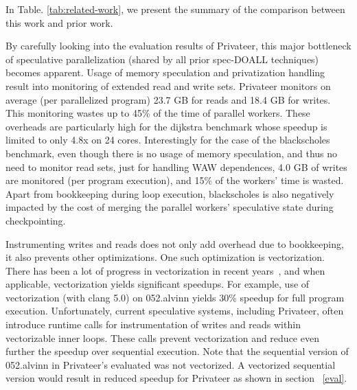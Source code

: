 In Table. \ref{tab:related-work}, we present the summary of the comparison
between this work and prior work.






By carefully looking into the evaluation results of Privateer, this major
bottleneck of speculative parallelization (shared by all prior spec-DOALL
techniques) becomes apparent.
%
Usage of memory speculation and privatization handling result into monitoring of
extended read and write sets.
%
Privateer monitors on average (per parallelized program) 23.7 GB for reads and
18.4 GB for writes.  This monitoring wastes up to 45\% of the time of parallel
workers.
%
These overheads are particularly high for the dijkstra benchmark whose speedup
is limited to only 4.8x on 24 cores.
%
Interestingly for the case of the blackscholes benchmark, even though there is
no usage of memory speculation, and thus no need to monitor read sets, just for
handling WAW dependences, 4.0 GB of writes are monitored (per program
execution), and 15\% of the workers' time is wasted.
%
Apart from bookkeeping during loop execution, blackscholes is also negatively
impacted by the cost of merging the parallel workers' speculative state during
checkpointing.

Instrumenting writes and reads does not only add overhead due to bookkeeping, it
also prevents other optimizations.
%
One such optimization is vectorization.  There has been a lot of progress in
vectorization in recent years~\cite{.., llvm, MIT, inte}, and when applicable,
vectorization yields significant speedups.
%
For example, use of vectorization (with clang 5.0) on 052.alvinn yields 30\%
speedup for full program execution.  Unfortunately, current speculative systems,
including Privateer, often introduce runtime calls for instrumentation of writes
and reads within vectorizable inner loops. These calls prevent vectorization and
reduce even further the speedup over sequential execution.
%
%
Note that the sequential version of 052.alvinn in Privateer's evaluated was not
vectorized. A vectorized sequential version would result in reduced speedup for
Privateer as shown in section ~\ref{eval}.


